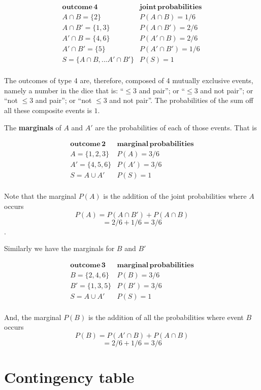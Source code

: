 \documentclass[
]{book}
\begin{document}
\[
\begin{array}{ll}
\mathbf{outcome\, 4}  & \mathbf{joint\,probabilities} \\
 A\cap B=\{2\}    & P(A\cap B)=1/6 \\
 A\cap B'=\{1,3\} & P(A\cap B')=2/6 \\
 A'\cap B=\{4,6\} & P(A'\cap B)=2/6 \\
 A'\cap B'=\{5\}  & P(A'\cap B')=1/6 \\ \hline
S=\{A\cap B, ... A'\cap B'\} & P(S)=1 \\ 
\end{array}
\]

The outcomes of type 4 are, therefore, composed of 4 mutually exclusive events, namely a number in the dice that is: ``\(\leq 3\) and pair''; or ``\(\leq 3\) and not pair''; or ``not \(\leq 3\) and pair''; or ``not \(\leq 3\) and not pair''. The probabilities of the sum off all these composite events is \(1\).

The \textbf{marginals} of \(A\) and \(A'\) are the probabilities of each of those events. That is

\[
\begin{array}{ll}
\mathbf{outcome\, 2}  & \mathbf{marginal\,probabilities} \\
 A=\{1,2,3\}    & P(A)=3/6 \\
 A'=\{4,5,6\} & P(A')=3/6 \\ \hline
S=A\cup A' & P(S)=1 \\ 
\end{array}
\]

Note that the marginal \(P(A)\) is the addition of the joint probabilities where \(A\) occurs \[P(A)=P(A\cap B') + P(A \cap B)\] \[=2/6+1/6=3/6\] .

Similarly we have the marginals for \(B\) and \(B'\)

\[
\begin{array}{ll}
\mathbf{outcome\, 3}  & \mathbf{marginal\,probabilities} \\
 B=\{2,4,6\}    & P(B)=3/6 \\
 B'=\{1,3,5\} & P(B')=3/6 \\ \hline
S=A\cup A' & P(S)=1 \\ 
\end{array}
\]

And, the marginal \(P(B)\) is the addition of all the probabilities where event \(B\) occurs \[P(B)=P(A'\cap B) +P(A \cap B)\] \[=2/6+1/6=3/6\]

\hypertarget{contingency-table}{%
\section{Contingency table}\label{contingency-table}}
\end{document}
